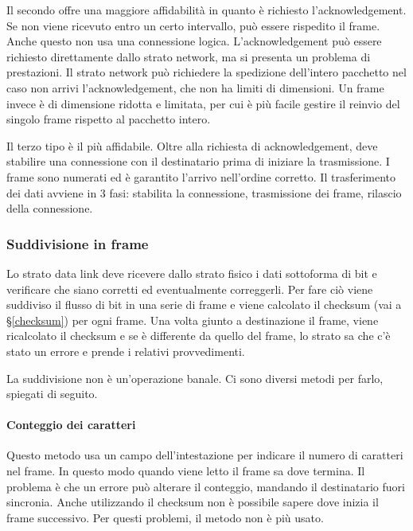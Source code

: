 Il secondo offre una maggiore affidabilità in quanto è richiesto l'acknowledgement.
Se non viene ricevuto entro un certo intervallo, può essere rispedito il frame. 
Anche questo non usa una connessione logica. 
L'acknowledgement può essere richiesto direttamente dallo strato network, ma si presenta un problema di prestazioni.
Il strato network può richiedere la spedizione dell'intero pacchetto nel caso non arrivi l'acknowledgement, che non ha limiti di dimensioni.
Un frame invece è di dimensione ridotta e limitata, per cui è più facile gestire il reinvio del singolo frame rispetto al pacchetto intero.

Il terzo tipo è il più affidabile. Oltre alla richiesta di acknowledgement, deve stabilire una connessione con il destinatario prima di iniziare la trasmissione.
I frame sono numerati ed è garantito l'arrivo nell'ordine corretto.
Il trasferimento dei dati avviene in 3 fasi: stabilita la connessione, trasmissione dei frame, rilascio della connessione. 

\subsubsection{Suddivisione in frame}
Lo strato data link deve ricevere dallo strato fisico i dati sottoforma di bit e verificare che siano corretti ed eventualmente correggerli.
Per fare ciò viene suddiviso il flusso di bit in una serie di frame e viene calcolato il checksum (vai a §\ref{checksum}) per ogni frame.
Una volta giunto a destinazione il frame, viene ricalcolato il checksum e se è differente da quello del frame, lo strato sa che c'è stato un errore e prende i relativi provvedimenti.

La suddivisione non è un'operazione banale. Ci sono diversi metodi per farlo, spiegati di seguito.

\paragraph{Conteggio dei caratteri}
Questo metodo usa un campo dell'intestazione per indicare il numero di caratteri nel frame.
In questo modo quando viene letto il frame sa dove termina.
Il problema è che un errore può alterare il conteggio, mandando il destinatario fuori sincronia.
Anche utilizzando il checksum non è possibile sapere dove inizia il frame successivo.
Per questi problemi, il metodo non è più usato.

